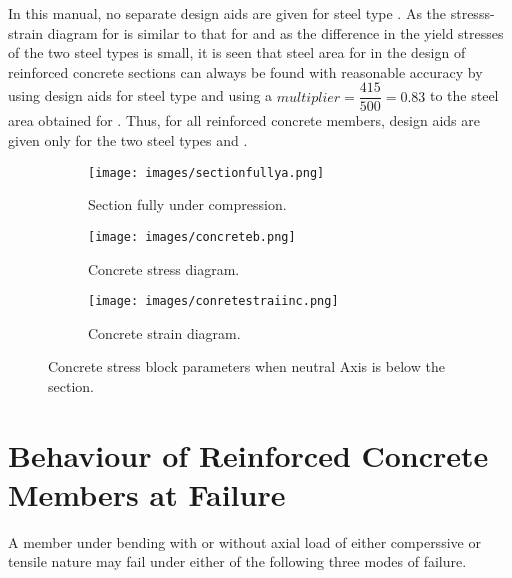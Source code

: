 In this manual, no separate design aids are given
for steel type {\fefivezerozero}. As the stresss-strain diagram for
{\fefivezerozero} is similar to that for {\fefouronefive} and as the
difference in the yield stresses of the two steel types is small, it
is seen that steel area for {\fefivezerozero}  in the design of
reinforced concrete sections can always be found with reasonable
accuracy by using design aids for steel type {\fefouronefive} and using
a $multiplier=\dfrac{415}{500} = 0.83$ to the steel area obtained for
{\fefouronefive}. Thus, for all reinforced concrete members, design aids
are given only for the two steel types {\fetwofivezero} and {\fefouronefive}.
\begin{figure}
\centering
\begin{subfigure}{0.3\textwidth}
\centering
\texttt{[image: images/sectionfullya.png]}
\caption{Section fully under compression.}
\label{fig:section}
\end{subfigure}
%
\begin{subfigure}{0.3\textwidth}
\centering
\texttt{[image: images/concreteb.png]}
\caption{Concrete stress diagram.}
\label{fig:sec}
\end{subfigure}
%
\begin{subfigure}{0.3\textwidth}
\centering
\texttt{[image: images/conretestraiinc.png]}
\caption{Concrete strain diagram.}
\label{fig:con}
\end{subfigure}
\caption{Concrete stress block parameters when neutral Axis is below the section.}
\label{fig:neutralAxis}
\end{figure}
\section{Behaviour of Reinforced Concrete Members at Failure}
A member under bending with or without axial load of either comperssive
or tensile nature may fail under either of the following three modes of
failure.

